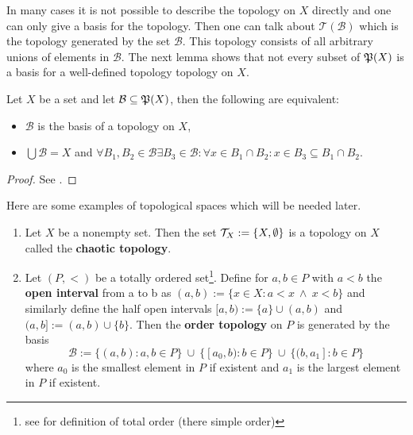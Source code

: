 In many cases it is not possible to describe the topology on $X$ directly and one can only give a basis for the topology. Then one can talk about $\mathcal{T}(\mathcal{B})$ which is the topology generated by the set $\mathcal{B}$. This topology consists of all arbitrary unions of elements in $\mathcal{B}$. The next lemma shows that not every subset of $\mathfrak{P}(X)$ is a basis for a well-defined topology topology on $X$.
\begin{lemma}
  Let $X$ be a set and let $\mathcal{B} \subseteq \mathfrak{P}(X)$, then the following are equivalent:
  \begin{itemize}
  \item $\mathcal{B}$ is the basis of a topology on $X$,
    \item $\bigcup \mathcal{B} = X$ and $\forall B_1, B_2 \in \mathcal{B}\exists B_3 \in \mathcal{B}\colon \forall x \in B_1\cap B_2\colon x \in B_3 \subseteq B_1\cap B_2$.
  \end{itemize}
\end{lemma}

\begin{proof}
  See \cite[p. 78f.]{MunTop}.
\end{proof}

\begin{ex}\label{ex:top}
  Here are some examples of topological spaces which will be needed later.
\begin{enumerate}[label=\roman*.)]
  \item \label{ex:top-chaotic} Let $X$ be a nonempty set. Then the set $\mathcal{T}_X := \{X, \emptyset\}$ is a topology on $X$ called the \textbf{chaotic topology}.
  \item \label{ex:top-order} Let $(P, <)$ be a totally ordered set\footnote{see \cite[p. 24]{MunTop} for definition of total order (there simple order)}. Define for $a, b \in P$ with $a < b$ the \textbf{open interval} from a to b as $(a,b) := \{ x \in X\colon a < x \: \land \: x < b \}$ and similarly define the half open intervals $[a,b) := \{a\} \cup (a,b)$ and $(a,b] := (a,b) \cup \{ b \}$. 
  Then the \textbf{order topology} on $P$ is generated by the basis
  \begin{equation*}
    \mathcal{B} := \{ (a,b) \colon a, b \in P \} \: \cup \: \{[a_0, b)\colon b \in P\} \: \cup \: \{ (b, a_1]\colon b \in P\}
  \end{equation*}
  where $a_0$ is the smallest element in $P$ if existent and $a_1$ is the largest element in $P$ if existent.
\end{enumerate}
\end{ex}

